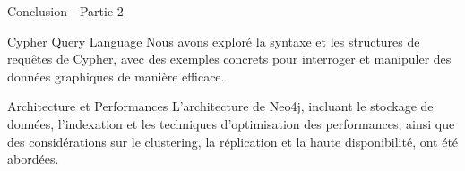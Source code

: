 \begin{frame}{Conclusion - Partie 2}
  \begin{block}{Cypher Query Language}
    Nous avons exploré la syntaxe et les structures de requêtes de Cypher, avec des exemples concrets pour interroger et manipuler des données graphiques de manière efficace.
  \end{block}
  
  \begin{block}{Architecture et Performances}
    L'architecture de Neo4j, incluant le stockage de données, l'indexation et les techniques d'optimisation des performances, ainsi que des considérations sur le clustering, la réplication et la haute disponibilité, ont été abordées.
  \end{block}
\end{frame}